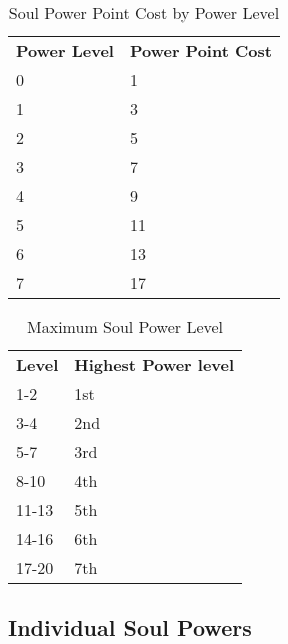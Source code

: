 \begin{table}[!htb]
  \caption{Soul Power Point Cost by Power Level}
  \begin{tabular}{p{2cm} p{3cm}}
    \textbf{Power Level} & \textbf{Power Point Cost} \\
    0 &  1 \\
    1 &  3 \\
    2 &  5 \\
    3 &  7 \\
    4 &  9 \\
    5 & 11 \\
    6 & 13 \\
    7 & 17 \\
  \end{tabular}
\end{table}

\begin{table}[!htb]
  \caption{Maximum Soul Power Level}
  \begin{tabular}{p{2cm} p{3cm}}
    \textbf{Level} & \textbf{Highest Power level} \\
    1-2   & 1st \\
    3-4   & 2nd \\
    5-7   & 3rd \\
    8-10  & 4th \\
    11-13 & 5th \\
    14-16 & 6th \\
    17-20 & 7th \\
  \end{tabular}
\end{table}

\subsection{Individual Soul Powers}

